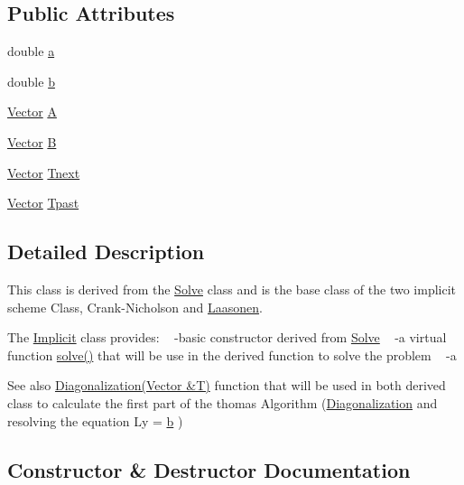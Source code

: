 \subsection*{Public Attributes}
\begin{DoxyCompactItemize}
\item 
double \hyperlink{class_implicit_a58a95622ffc58ae2f468d3ef4f0d215c}{a}
\item 
double \hyperlink{class_implicit_a270615b52e1106f89b4e6ef928cc12de}{b}
\item 
\hyperlink{class_vector}{Vector} \hyperlink{class_implicit_a5bdc685b164fc363d26ed1461c0d49b2}{A}
\item 
\hyperlink{class_vector}{Vector} \hyperlink{class_implicit_a3f9c9eda634c19c2301698fd81ec5a6b}{B}
\item 
\hyperlink{class_vector}{Vector} \hyperlink{class_implicit_a854215cf2128a1dc1f532bb6664b472c}{Tnext}
\item 
\hyperlink{class_vector}{Vector} \hyperlink{class_implicit_a6cd9e0093600402e8bc3b22995aa96b1}{Tpast}
\end{DoxyCompactItemize}


\subsection{Detailed Description}
This class is derived from the \hyperlink{class_solve}{Solve} class and is the base class of the two implicit scheme Class, Crank-\/\+Nicholson and \hyperlink{class_laasonen}{Laasonen}.

The \hyperlink{class_implicit}{Implicit} class provides\+: ~\newline
-\/basic constructor derived from \hyperlink{class_solve}{Solve} ~\newline
-\/a virtual function \hyperlink{class_implicit_a027adb4276376991f75fcffbd34740b3}{solve()} that will be use in the derived function to solve the problem ~\newline
-\/a \begin{DoxySeeAlso}{See also}
\hyperlink{class_implicit_a572fff2232977c83c432f993f37a7853}{Diagonalization(\+Vector \&\+T)} function that will be used in both derived class to calculate the first part of the thomas Algorithm (\hyperlink{class_implicit_a572fff2232977c83c432f993f37a7853}{Diagonalization} and resolving the equation Ly = \hyperlink{class_implicit_a270615b52e1106f89b4e6ef928cc12de}{b} ) 
\end{DoxySeeAlso}


\subsection{Constructor \& Destructor Documentation}
\mbox{\label{class_implicit_a5a98f30bdf419368901ce9468a7065a3}} 
